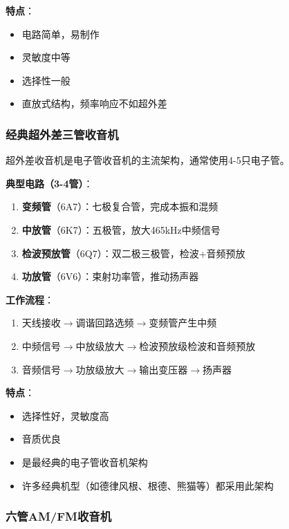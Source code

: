 \textbf{特点}：
\begin{itemize}
    \item 电路简单，易制作
    \item 灵敏度中等
    \item 选择性一般
    \item 直放式结构，频率响应不如超外差
\end{itemize}

\subsubsection{经典超外差三管收音机}
\label{sec:superheterodyne_radio}

超外差收音机是电子管收音机的主流架构，通常使用4-5只电子管。

\textbf{典型电路（3-4管）}：
\begin{enumerate}
    \item \textbf{变频管}（6A7）：七极复合管，完成本振和混频
    \item \textbf{中放管}（6K7）：五极管，放大465kHz中频信号
    \item \textbf{检波预放管}（6Q7）：双二极三极管，检波+音频预放
    \item \textbf{功放管}（6V6）：束射功率管，推动扬声器
\end{enumerate}

\textbf{工作流程}：
\begin{enumerate}
    \item 天线接收$\to$调谐回路选频$\to$变频管产生中频
    \item 中频信号$\to$中放级放大$\to$检波预放级检波和音频预放
    \item 音频信号$\to$功放级放大$\to$输出变压器$\to$扬声器
\end{enumerate}

\textbf{特点}：
\begin{itemize}
    \item 选择性好，灵敏度高
    \item 音质优良
    \item 是最经典的电子管收音机架构
    \item 许多经典机型（如德律风根、根德、熊猫等）都采用此架构
\end{itemize}

\subsubsection{六管AM/FM收音机}
\label{sec:six_tube_radio}

